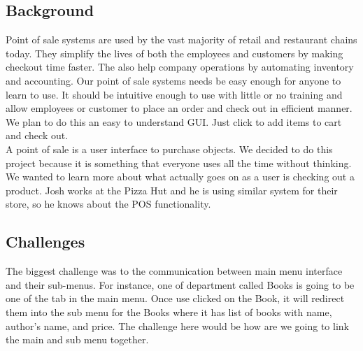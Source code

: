 \documentclass[10pt,conference,onecolumn,compsoc]{IEEEtran}
\begin{document}

\subsection{Background}



Point of sale systems are used by the vast majority of retail and restaurant chains today. They simplify the lives of both the employees and customers by making checkout time faster. The also help company operations by automating inventory and accounting. Our point of sale systems needs be easy enough for anyone to learn to use. It should be intuitive enough to use with little or no training and allow employees or customer to place an order and check out in efficient manner. We plan to do this an easy to understand GUI. Just click to add items to cart and check out. \\

A point of sale is a user interface to purchase objects. We decided to do this project because it is something that everyone uses all the time without thinking. We wanted to learn more about what actually goes on as a user is checking out a product. Josh works at the Pizza Hut and he is using similar system for their store, so he knows about the POS functionality. 


\subsection{Challenges}
The biggest challenge was to the communication between main menu interface and their sub-menus. For instance, one of department called Books is going to be one of the tab in the main menu. Once use clicked on the Book, it will redirect them into the sub menu for the Books where it has list of books with name, author's name, and price. The challenge here would be how are we going to link the main and sub menu together. \\
\end{document}
